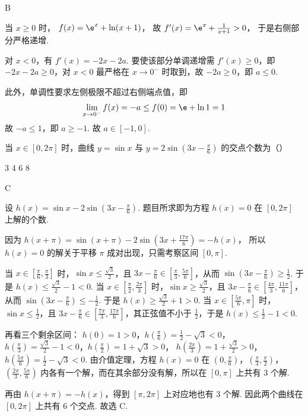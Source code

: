 \begin{answer}
B
\end{answer}

\begin{solution}
当 \(x\ge 0\) 时，
\(f(x)=\e^x+\ln(x+1)\)，
故
\(f'(x)=\e^x+\frac1{x+1}>0\)，
于是右侧部分严格递增.

对 \(x<0\)，有
\(f'(x)=-2x-2a\).
要使该部分单调递增需 \(f'(x)\ge 0\)，即 \(-2x-2a\ge 0\)，对 \(x<0\) 最严格在 \(x\to0^-\) 时取到，故 \(-2a\ge 0\)，即 \(a\le0\).

此外，单调性要求左侧极限不超过右侧端点值，即
\[
\lim\limits_{x\to0^-}f(x)=-a\le f(0)=\e+\ln1=1
\]
故 \(-a\le1\)，即 \(a\ge-1\). 故 \(a\in[-1,0]\).
\end{solution}

\begin{problem}
当 \(x\in[0,2\pi]\) 时，曲线 \(y=\sin x\) 与 \(y=2\sin\!\left(3x-\frac{\pi}{6}\right)\) 的交点个数为（\quad）

\choices
    {3}
    {4}
    {6}
    {8}
\end{problem}

\begin{answer}
C
\end{answer}

\begin{solution}
设
\(h(x)=\sin x-2\sin\left(3x-\frac{\pi}{6}\right)\).
题目所求即为方程 \(h(x)=0\) 在 \([0,2\pi]\) 上解的个数.

因为
\(h(x+\pi)=\sin(x+\pi)-2\sin\left(3x+\frac{17\pi}{6}\right)=-h(x)\)，
所以 \(h(x)=0\) 的解关于平移 \(\pi\) 成对出现，只需考察区间 \([0,\pi]\).

当 \(x\in\left[\frac{\pi}{6},\frac{\pi}{3}\right]\) 时，\(\sin x\le \frac{\sqrt3}{2}\)，且 \(3x-\frac{\pi}{6}\in\left[\frac{\pi}{3},\frac{5\pi}{6}\right]\)，从而 \(\sin\left(3x-\frac{\pi}{6}\right)\ge \frac12\). 于是
\(h(x)\le \frac{\sqrt3}{2}-1<0\).
当 \(x\in\left[\frac{\pi}{2},\frac{2\pi}{3}\right]\) 时，\(\sin x\ge \frac{\sqrt3}{2}\)，且 \(3x-\frac{\pi}{6}\in\left[\frac{4\pi}{3},\frac{11\pi}{6}\right]\)，从而 \(\sin\left(3x-\frac{\pi}{6}\right)\le -\frac12\). 于是
\(h(x)\ge \frac{\sqrt3}{2}+1>0\).
当 \(x\in\left[\frac{5\pi}{6},\pi\right]\) 时，\(\sin x\le \frac12\)，且 \(3x-\frac{\pi}{6}\in\left[\frac{7\pi}{3},\frac{17\pi}{6}\right]\)，其正弦值不小于 \(\frac12\)，于是
\(h(x)\le \frac12-1<0\).


再看三个剩余区间：
\(h(0)=1>0\)，\(h\left(\frac{\pi}{6}\right)=\frac12-\sqrt3<0\)，
\(h\left(\frac{\pi}{3}\right)=\frac{\sqrt3}{2}-1<0\)，\(h\left(\frac{\pi}{2}\right)=1+\sqrt3>0\)，
\(h\left(\frac{2\pi}{3}\right)=1+\frac{\sqrt3}{2}>0\)，\(h\left(\frac{5\pi}{6}\right)=\frac12-\sqrt3<0\).
由介值定理，方程 \(h(x)=0\) 在
\(\left(0,\frac{\pi}{6}\right)\)，\(\left(\frac{\pi}{3},\frac{\pi}{2}\right)\)，\(\left(\frac{2\pi}{3},\frac{5\pi}{6}\right)\)
内各有一个解，而在其余部分没有解，所以在 \([0,\pi]\) 上共有 \(3\) 个解.

再由 \(h(x+\pi)=-h(x)\)，得到 \([\pi,2\pi]\) 上对应地也有 \(3\) 个解. 因此两个曲线在 \([0,2\pi]\) 上共有 \(6\) 个交点. 故选 C.
\end{solution}

